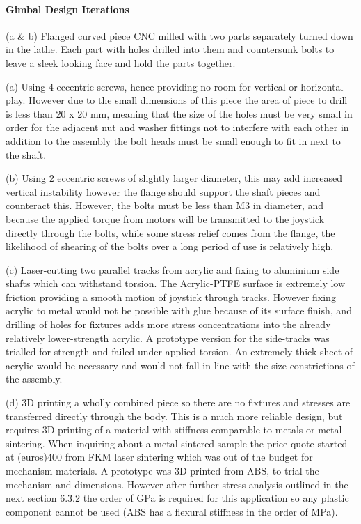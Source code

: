 
\paragraph{Gimbal Design Iterations} %
\label{par:gimbal_design_iterations}

(a \& b) Flanged curved piece CNC milled with two parts separately turned down in the lathe. Each part with holes drilled into them and countersunk bolts to leave a sleek looking face and hold the parts together.

(a) Using 4 eccentric screws, hence providing no room for vertical or horizontal play. However due to the small dimensions of this piece the area of piece to drill is less than 20 x 20 mm, meaning that the size of the holes must be very small in order for the adjacent nut and washer fittings not to interfere with each other in addition to the assembly the bolt heads must be small enough to fit in next to the shaft.

(b) Using 2 eccentric screws of slightly larger diameter, this may add increased vertical instability however the flange should support the shaft pieces and counteract this. However, the bolts must be less than M3 in diameter, and because the applied torque from motors will be transmitted to the joystick directly through the bolts, while some stress relief comes from the flange, the likelihood of shearing of the bolts over a long period of use is relatively high.

(c) Laser-cutting two parallel tracks from acrylic and fixing to aluminium side shafts which can withstand torsion. The Acrylic-PTFE surface is extremely low friction providing a smooth motion of joystick through tracks. However fixing acrylic to metal would not be possible with glue because of its surface finish, and drilling of holes for fixtures adds more stress concentrations into the already relatively lower-strength acrylic. A prototype version for the side-tracks was trialled for strength and failed under applied torsion. An extremely thick sheet of acrylic would be necessary and would not fall in line with the size constrictions of the assembly.

(d) 3D printing a wholly combined piece so there are no fixtures and stresses are transferred directly through the body. This is a much more reliable design, but requires 3D printing of a material with stiffness comparable to metals or metal sintering. When inquiring about a metal sintered sample the price quote started at (euros)400 from FKM laser sintering which was out of the budget for mechanism materials. A prototype was 3D printed from ABS, to trial the mechanism and dimensions. However after further stress analysis outlined in the next section 6.3.2 the order of GPa is required for this application so any plastic component cannot be used (ABS has a flexural stiffness in the order of MPa).

